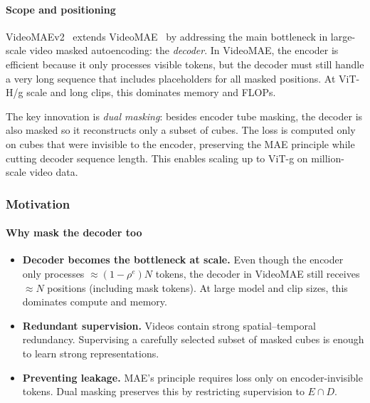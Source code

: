 \begin{enrichment}
    \newpage
    
    \begin{enrichment}
        \label{enr:subsec_chapter24_videomaev2}
            
            \paragraph{Scope and positioning}
            VideoMAEv2~\cite{wang2023_videomaev2} extends VideoMAE~\cite{tong2022_videomae} by addressing the main bottleneck in large-scale video masked autoencoding: the \emph{decoder}. In VideoMAE, the encoder is efficient because it only processes visible tokens, but the decoder must still handle a very long sequence that includes placeholders for all masked positions. At ViT-H/g scale and long clips, this dominates memory and FLOPs. 
            
            The key innovation is \emph{dual masking}: besides encoder tube masking, the decoder is also masked so it reconstructs only a subset of cubes. The loss is computed only on cubes that were invisible to the encoder, preserving the MAE principle while cutting decoder sequence length. This enables scaling up to ViT-g on million-scale video data.
            
            \subsubsection{Motivation}
            \label{subsubsec_chapter24_videomaev2_motivation}
            
            \paragraph{Why mask the decoder too}
            \begin{itemize}
                \item \textbf{Decoder becomes the bottleneck at scale.} Even though the encoder only processes $\approx (1{-}\rho^e)N$ tokens, the decoder in VideoMAE still receives $\approx N$ positions (including mask tokens). At large model and clip sizes, this dominates compute and memory.
                \item \textbf{Redundant supervision.} Videos contain strong spatial–temporal redundancy. Supervising a carefully selected subset of masked cubes is enough to learn strong representations.
                \item \textbf{Preventing leakage.} MAE’s principle requires loss only on encoder-invisible tokens. Dual masking preserves this by restricting supervision to $E\cap D$.
            \end{itemize}
            

\end{enrichment}
\end{enrichment}
